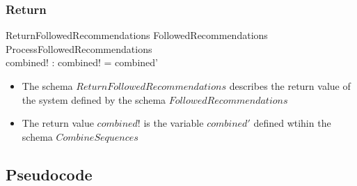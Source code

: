 \documentclass{article}
\begin{document}
\subsubsection{Return}

\begin{schema}{ReturnFollowedRecommendations}
  \Xi FollowedRecommendations \\
  ProcessFollowedRecommendations \\
  combined! : \seq
  \where
  combined! = combined'
\end{schema}

\begin{itemize}
  \item The schema $ReturnFollowedRecommendations$ describes the return
    value of the system defined by the schema
    $FollowedRecommendations$
  \item The return value $combined!$ is the variable $combined'$
    defined wtihin the schema $CombineSequences$
\end{itemize}

\subsection{Pseudocode}
\end{document}
